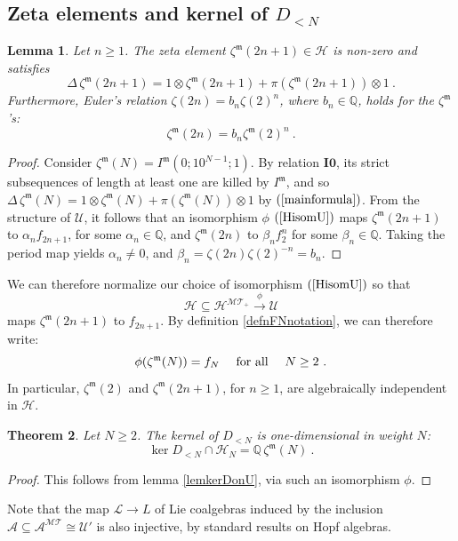 \documentclass[10pt]{amsart}
\newtheorem{thm}{Theorem}[section]
\newtheorem{lem}[thm]{Lemma}
\theoremstyle{definition}
\theoremstyle{remark}
\numberwithin{equation}{section}
\newcommand{\Ho}{\mathcal{H}}
\newcommand{\Homt}{\mathcal{H^{MT_+}}}
\newcommand{\MT}{\mathcal{MT}}
\newcommand{\Ao}{\mathcal{A}}
\newcommand{\Io}{\mathbf{I0}}
\newcommand{\zetam}{\zeta^{ \mathfrak{m}}}
\newcommand{\Imot}{I^{\mathfrak{m}}}
\newcommand{\Q}{\mathbb Q}
\newcommand{\Lo}{\mathcal{L}}
\newcommand{\U}{\mathcal{U}}
\newcommand{\To}{\longrightarrow}
\newcommand{\Amt}{\mathcal{A}^{\MT}}
\begin{document}
\subsection{Zeta elements and kernel of $D_{<N}$} 
\begin{lem} \label{lemzetaelements} Let $n\geq 1$. The zeta element   $\zetam(2n+1)\in \Ho$ is non-zero and satisfies
$$
\Delta\, \zetam(2n+1) = 1 \otimes \zetam(2n+1) + \pi( \zetam(2n+1)) \otimes 1\ . 
$$
Furthermore, Euler's relation $\zeta(2n)= b_n \zeta(2)^n$, where $b_n \in \Q$, holds for the $\zetam$'s:
\begin{equation} \label{zetam2n} \zetam(2n) = b_n \zetam(2)^n \ .
\end{equation}
 \end{lem}
\begin{proof} Consider $\zetam(N) = \Imot(0;10^{N-1};1)$. By relation $\Io$,  its strict subsequences of length at least one are killed by $\Imot$, and  so
$\Delta \, \zetam(N) = 1\otimes \zetam(N) + \pi(\zetam(N)) \otimes 1$ by  
$(\ref{mainformula})$.
From the structure of $\U$, it  follows that an isomorphism  $\phi$  $(\ref{HisomU})$ maps $\zetam(2n+1)$ to $\alpha_n f_{2n+1}$, for some $\alpha_n \in \Q$, and $\zetam(2n)$ to $\beta_n f^n_2$ for some $\beta_n\in \Q$.
  Taking the period map yields $\alpha_n\neq 0$, and $\beta_n=\zeta(2n) \zeta(2)^{-n}=b_n$.
\end{proof}

We can therefore normalize our choice of  isomorphism  $(\ref{HisomU})$  so that
$$\Ho \subseteq  \Homt \overset{\phi}{\To} \U  $$
maps   $\zetam(2n+1)$ to $f_{2n+1}$. By definition \ref{defnFNnotation},     we can therefore write:
\begin{equation} \label{phinormed}
\phi(\zetam(N))=f_N \quad   \hbox{ for all } \quad  N\geq 2 \ . 
\end{equation}
In particular, $\zetam(2)$ and $\zetam(2n+1)$, for $n\geq 1$, are algebraically independent in $\Ho$.

 
\begin{thm} \label{propkerD} Let $N\geq 2$.  The kernel of $D_{<N}$ is one-dimensional in  weight $N$:  
$$\ker D_{<N} \cap \Ho_N = \Q\,\zetam(N)\ .$$
\end{thm} 
\begin{proof} This  follows from lemma \ref{lemkerDonU}, via such an isomorphism $\phi$. 
 \end{proof}
 Note that the map $\Lo\rightarrow L$ of Lie coalgebras induced by the inclusion $\Ao \subseteq\Amt\cong \U'$ is also injective, by standard results  on  Hopf algebras. 
\end{document}
